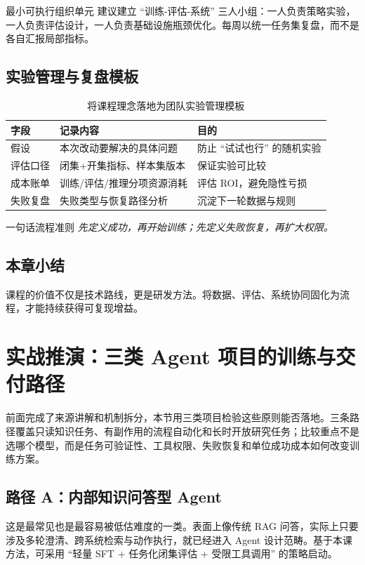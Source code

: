 \documentclass[a4paper]{article}
\begin{document}
\begin{importantbox}{最小可执行组织单元}
建议建立 ``训练-评估-系统'' 三人小组：一人负责策略实验，一人负责评估设计，一人负责基础设施瓶颈优化。每周以统一任务集复盘，而不是各自汇报局部指标。
\end{importantbox}

\subsection{实验管理与复盘模板}
\begin{table}[H]
\centering
\begin{tabular}{p{2.5cm}p{4.1cm}p{5.1cm}}
\toprule
\textbf{字段} & \textbf{记录内容} & \textbf{目的} \\
\midrule
假设 & 本次改动要解决的具体问题 & 防止 ``试试也行'' 的随机实验 \\
评估口径 & 闭集+开集指标、样本集版本 & 保证实验可比较 \\
成本账单 & 训练/评估/推理分项资源消耗 & 评估 ROI，避免隐性亏损 \\
失败复盘 & 失败类型与恢复路径分析 & 沉淀下一轮数据与规则 \\
\bottomrule
\end{tabular}
\caption{将课程理念落地为团队实验管理模板}
\end{table}

\begin{knowledgebox}{一句话流程准则}
\textit{先定义成功，再开始训练；先定义失败恢复，再扩大权限。}
\end{knowledgebox}

\subsection{本章小结}
课程的价值不仅是技术路线，更是研发方法。将数据、评估、系统协同固化为流程，才能持续获得可复现增益。


\section{实战推演：三类 Agent 项目的训练与交付路径}

前面完成了来源讲解和机制拆分，本节用三类项目检验这些原则能否落地。三条路径覆盖只读知识任务、有副作用的流程自动化和长时开放研究任务；比较重点不是选哪个模型，而是任务可验证性、工具权限、失败恢复和单位成功成本如何改变训练方案。

\subsection{路径 A：内部知识问答型 Agent}
这是最常见也是最容易被低估难度的一类。表面上像传统 RAG 问答，实际上只要涉及多轮澄清、跨系统检索与动作执行，就已经进入 Agent 设计范畴。基于本课方法，可采用 ``轻量 SFT + 任务化闭集评估 + 受限工具调用'' 的策略启动。
\end{document}
